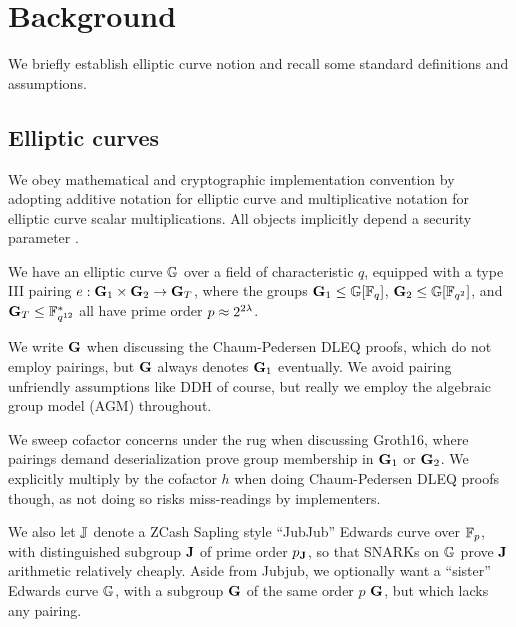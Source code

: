 
\section{Background}
\label{sec:background}

We briefly establish elliptic curve notion and recall some standard
definitions and assumptions.



\subsection{Elliptic curves}


We obey mathematical and cryptographic implementation convention by 
adopting additive notation for elliptic curve and multiplicative notation
for elliptic curve scalar multiplications.
%
All objects implicitly depend a security parameter \secparam.

We have an elliptic curve ${\mathbb{G}}$ over a field of characteristic $q$,
equipped with a type III pairing $e : {\mathbf{G}}_1 \times {\mathbf{G}}_2 \to {\mathbf{G}}_T$,
where the groups  ${\mathbf{G}}_1 \le {\mathbb{G}}[\mathbb{F}_q]$, ${\mathbf{G}}_2 \le {\mathbb{G}}[\mathbb{F}_{q^2}]$, and
${\mathbf{G}}_T \le \mathbb{F}^*_{q^{12}}$ all have prime order $p \approx 2^{2\lambda}$.

We write ${\mathbf{G}}$ when discussing the Chaum-Pedersen DLEQ proofs, which do
not employ pairings, but ${\mathbf{G}}$ always denotes ${\mathbf{G}}_1$ eventually.
We avoid pairing unfriendly assumptions like DDH of course, but really
we employ the algebraic group model (AGM) throughout.

We sweep cofactor concerns under the rug when discussing Groth16,
where pairings demand deserialization prove group membership in ${\mathbf{G}}_1$
or ${\mathbf{G}}_2$.  We explicitly multiply by the cofactor $h$ when doing
Chaum-Pedersen DLEQ proofs though, as not doing so risks miss-readings by implementers.

We also let ${\mathbb{J}}$ denote a ZCash Sapling style ``JubJub'' Edwards curve
over $\mathbb{F}_p$, with distinguished subgroup ${\mathbf{J}}$ of prime order $p_{\mathbf{J}}$, so that
SNARKs on ${\mathbb{G}}$ prove ${\mathbf{J}}$ arithmetic relatively cheaply.
Aside from Jubjub, we optionally want a ``sister'' Edwards curve ${\mathbb{G}}$,
with a subgroup ${\mathbf{G}}$ of the same order $p$ ${\mathbf{G}}$, but which lacks any pairing.

